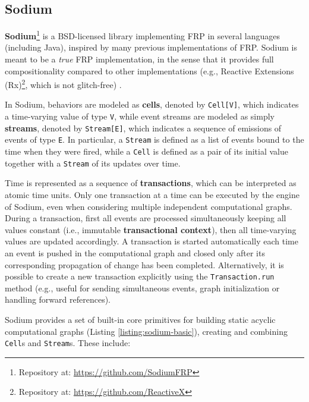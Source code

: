 
\subsection{Sodium}
\label{section:background:technologies:sodium}

\textbf{Sodium}\footnote{Repository at: \url{https://github.com/SodiumFRP}} is a
BSD-licensed library implementing \ac{FRP} in several languages (including
Java), inspired by many previous implementations of \ac{FRP}. Sodium
is meant to be a \textit{true} \ac{FRP} implementation, in the sense that it
provides full compositionality compared to other implementations (e.g., Reactive
Extensions (Rx)\footnote{Repository at: \url{https://github.com/ReactiveX}},
which is not glitch-free) \cite{FRP}.

In Sodium, behaviors are modeled as \textbf{cells}, denoted by
\texttt{Cell[V]}, which indicates a time-varying value of type \texttt{V},
while event streams are modeled as simply \textbf{streams}, denoted by
\texttt{Stream[E]}, which indicates a sequence of emissions of events of type
\texttt{E}. In particular, a \texttt{Stream} is defined as a list of events
bound to the time when they were fired, while a \texttt{Cell} is defined as a
pair of its initial value together with a \texttt{Stream} of its updates over
time.

Time is represented as a sequence of \textbf{transactions}, which can be
interpreted as atomic time units. Only one transaction at a time can be
executed by the engine of Sodium, even when considering multiple independent
computational graphs. During a transaction, first all events are processed
simultaneously keeping all values constant (i.e., immutable
\textbf{transactional context}), then all time-varying values are updated
accordingly. A transaction is started automatically each time an event is
pushed in the computational graph and closed only after its corresponding
propagation of change has been completed. Alternatively, it is possible to
create a new transaction explicitly using the \texttt{Transaction.run} method
(e.g., useful for sending simultaneous events, graph initialization or handling
forward references).

Sodium provides a set of built-in core primitives for building static acyclic
computational graphs (Listing \ref{listing:sodium-basic}), creating and
combining \texttt{Cell}s and \texttt{Stream}s. These include:


